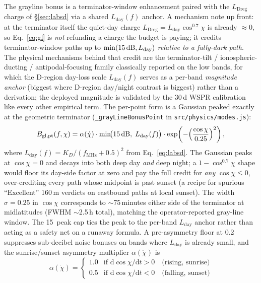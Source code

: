 \documentclass[11pt,a4paper]{article}
\newcommand{\SI}[2]{#1\,\text{#2}}
\newcommand{\dB}{\text{dB}}
\begin{document}
The grayline bonus is a terminator-window enhancement paired with
the $L_{\text{Dreg}}$ charge of \S\ref{sec:labsd} via a shared
$L_{\text{day}}(f)$ anchor.  A mechanism note up
front: at the terminator itself the quiet-day charge
$L_{\text{Dreg}} = L_{\text{day}}\cos^{0.7}\chi$ is already
${\approx}0$, so Eq.~\ref{eq:gl} is \emph{not} refunding a charge
the budget is paying; it credits terminator-window paths up to
$\min(\SI{15}{\dB}, L_{\text{day}})$ \emph{relative to a
fully-dark path}.  The physical mechanisms behind that credit are
the terminator-tilt / ionospheric-ducting / antipodal-focusing
family classically reported on the low bands, for which the
D-region day-loss scale $L_{\text{day}}(f)$ serves as a
per-band \emph{magnitude anchor} (biggest where D-region
day/night contrast is biggest) rather than a derivation; the
deployed magnitude is validated by the 30\,d WSPR calibration
like every other empirical term.  The per-point form is a Gaussian
peaked exactly at the geometric terminator
(\texttt{\_grayLineBonusPoint} in \texttt{src/physics/modes.js}):
\begin{equation}\label{eq:gl}
  B_{\text{gl,pt}}(f, \chi) =
    \alpha(\dot\chi) \cdot
    \min\!\bigl(\SI{15}{\dB},\; L_{\text{day}}(f)\bigr) \cdot
    \exp\!\left(-\Bigl(\frac{\cos\chi}{0.25}\Bigr)^{2}\right),
\end{equation}
where $L_{\text{day}}(f) = K_D / (f_{\text{MHz}} + 0.5)^{2}$ from
Eq.~\ref{eq:labsd}.  The Gaussian peaks at $\cos\chi = 0$ and
decays into both deep day \emph{and} deep night; a
$1 - \cos^{0.7}\chi$ shape would floor its day-side factor at zero
and pay the full credit for \emph{any} $\cos\chi \le 0$,
over-crediting every path whose midpoint is past sunset (a
recipe for spurious ``Excellent'' 160\,m verdicts on
eastbound paths at local sunset).  The width $\sigma = 0.25$ in
$\cos\chi$ corresponds to ${\sim}$75\,minutes either side of the
terminator at midlatitudes (FWHM ${\sim}$2.5\,h total), matching
the operator-reported gray-line window.  The
\SI{15}{\dB} peak cap ties the peak
to the per-band $L_{\text{day}}$ anchor rather than
acting as a safety net on a runaway formula.  A pre-asymmetry floor at
\SI{0.2}{\dB} suppresses sub-decibel noise bonuses on bands
where $L_{\text{day}}$ is already small, and the sunrise/sunset
asymmetry multiplier $\alpha(\dot\chi)$ is
\begin{equation*}
  \alpha(\dot\chi) =
    \begin{cases}
      1.0 & \text{if } \mathrm{d}\!\cos\chi/\mathrm{d}t > 0
            \quad\text{(rising, sunrise)} \\
      0.5 & \text{if } \mathrm{d}\!\cos\chi/\mathrm{d}t < 0
            \quad\text{(falling, sunset)}
    \end{cases}
\end{equation*}
\end{document}
